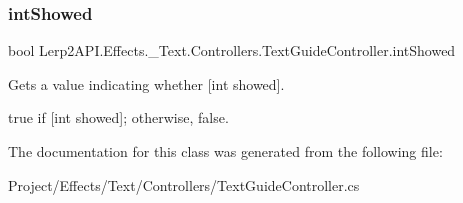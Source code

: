\subsubsection{\texorpdfstring{int\+Showed}{intShowed}}
{\footnotesize\ttfamily bool Lerp2\+A\+P\+I.\+Effects.\+\_\+\+Text.\+Controllers.\+Text\+Guide\+Controller.\+int\+Showed\hspace{0.3cm}{\ttfamily [get]}}



Gets a value indicating whether \mbox{[}int showed\mbox{]}. 

{\ttfamily true} if \mbox{[}int showed\mbox{]}; otherwise, {\ttfamily false}.

The documentation for this class was generated from the following file\+:\begin{DoxyCompactItemize}
\item 
Project/\+Effects/\+Text/\+Controllers/Text\+Guide\+Controller.\+cs\end{DoxyCompactItemize}
